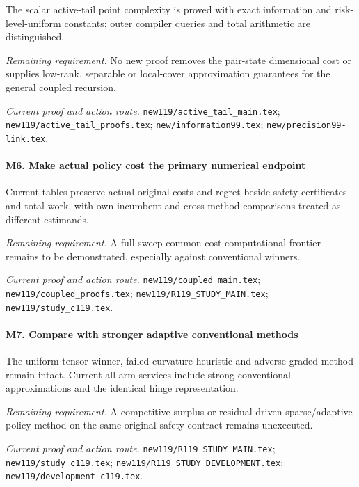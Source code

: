 The scalar active-tail point complexity is proved with exact information and risk-level-uniform constants; outer compiler queries and total arithmetic are distinguished.

\par\emph{Remaining requirement.} No new proof removes the pair-state dimensional cost or supplies low-rank, separable or local-cover approximation guarantees for the general coupled recursion.

\par\emph{Current proof and action route.} \nolinkurl{new119/active_tail_main.tex}; \nolinkurl{new119/active_tail_proofs.tex}; \nolinkurl{new/information99.tex}; \nolinkurl{new/precision99-link.tex}.

\paragraph{M6. Make actual policy cost the primary numerical endpoint}

Current tables preserve actual original costs and regret beside safety certificates and total work, with own-incumbent and cross-method comparisons treated as different estimands.

\par\emph{Remaining requirement.} A full-sweep common-cost computational frontier remains to be demonstrated, especially against conventional winners.

\par\emph{Current proof and action route.} \nolinkurl{new119/coupled_main.tex}; \nolinkurl{new119/coupled_proofs.tex}; \nolinkurl{new119/R119_STUDY_MAIN.tex}; \nolinkurl{new119/study_c119.tex}.

\paragraph{M7. Compare with stronger adaptive conventional methods}

The uniform tensor winner, failed curvature heuristic and adverse graded method remain intact. Current all-arm services include strong conventional approximations and the identical hinge representation.

\par\emph{Remaining requirement.} A competitive surplus or residual-driven sparse/\allowbreak{}adaptive policy method on the same original safety contract remains unexecuted.

\par\emph{Current proof and action route.} \nolinkurl{new119/R119_STUDY_MAIN.tex}; \nolinkurl{new119/study_c119.tex}; \nolinkurl{new119/R119_STUDY_DEVELOPMENT.tex}; \nolinkurl{new119/development_c119.tex}.

